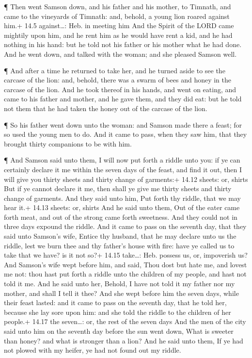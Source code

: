  ¶ Then went Samson down, and his father and his mother, to
Timnath, and came to the vineyards of Timnath: and, behold, a young lion
roared against him.+ 14.5 against\ldots: Heb. in meeting him
 And the Spirit of the LORD came mightily upon him, and he
rent him as he would have rent a kid, and he had nothing in his hand:
but he told not his father or his mother what he had done. 
And he went down, and talked with the woman; and she pleased Samson
well.

 ¶ And after a time he returned to take her, and he turned
aside to see the carcase of the lion: and, behold, there was a swarm of
bees and honey in the carcase of the lion.  And he took
thereof in his hands, and went on eating, and came to his father and
mother, and he gave them, and they did eat: but he told not them that he
had taken the honey out of the carcase of the lion.

 ¶ So his father went down unto the woman: and Samson made
there a feast; for so used the young men to do.  And it
came to pass, when they saw him, that they brought thirty companions to
be with him.

 ¶ And Samson said unto them, I will now put forth a riddle
unto you: if ye can certainly declare it me within the seven days of the
feast, and find it out, then I will give you thirty sheets and thirty
change of garments:+ 14.12 sheets: or, shirts  But if ye
cannot declare it me, then shall ye give me thirty sheets and thirty
change of garments. And they said unto him, Put forth thy riddle, that
we may hear it.+ 14.13 sheets: or, shirts  And he said unto
them, Out of the eater came forth meat, and out of the strong came forth
sweetness. And they could not in three days expound the riddle.
 And it came to pass on the seventh day, that they said
unto Samson's wife, Entice thy husband, that he may declare unto us the
riddle, lest we burn thee and thy father's house with fire: have ye
called us to take that we have? is it not so?+ 14.15 take\ldots: Heb.
possess us, or, impoverish us?  And Samson's wife wept
before him, and said, Thou dost but hate me, and lovest me not: thou
hast put forth a riddle unto the children of my people, and hast not
told it me. And he said unto her, Behold, I have not told it my father
nor my mother, and shall I tell it thee?  And she wept
before him the seven days, while their feast lasted: and it came to pass
on the seventh day, that he told her, because she lay sore upon him: and
she told the riddle to the children of her people.+ 14.17 the
seven\ldots: or, the rest of the seven days  And the men of
the city said unto him on the seventh day before the sun went down, What
is sweeter than honey? and what is stronger than a lion? And he said
unto them, If ye had not plowed with my heifer, ye had not found out my
riddle.

